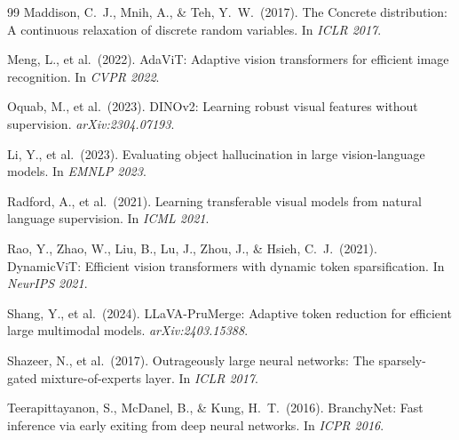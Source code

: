 \documentclass[11pt,a4paper]{article}
\begin{document}
\begin{thebibliography}{99}
Maddison, C.~J., Mnih, A., \& Teh, Y.~W.\ (2017).
\newblock The Concrete distribution: A continuous relaxation of discrete random
  variables.
\newblock In \textit{ICLR 2017}.

Meng, L., et al.\ (2022).
\newblock AdaViT: Adaptive vision transformers for efficient image recognition.
\newblock In \textit{CVPR 2022}.

Oquab, M., et al.\ (2023).
\newblock DINOv2: Learning robust visual features without supervision.
\newblock \textit{arXiv:2304.07193}.

Li, Y., et al.\ (2023).
\newblock Evaluating object hallucination in large vision-language models.
\newblock In \textit{EMNLP 2023}.

Radford, A., et al.\ (2021).
\newblock Learning transferable visual models from natural language supervision.
\newblock In \textit{ICML 2021}.

Rao, Y., Zhao, W., Liu, B., Lu, J., Zhou, J., \& Hsieh, C.~J.\ (2021).
\newblock DynamicViT: Efficient vision transformers with dynamic token
  sparsification.
\newblock In \textit{NeurIPS 2021}.

Shang, Y., et al.\ (2024).
\newblock LLaVA-PruMerge: Adaptive token reduction for efficient large
  multimodal models.
\newblock \textit{arXiv:2403.15388}.

Shazeer, N., et al.\ (2017).
\newblock Outrageously large neural networks: The sparsely-gated
  mixture-of-experts layer.
\newblock In \textit{ICLR 2017}.

Teerapittayanon, S., McDanel, B., \& Kung, H.~T.\ (2016).
\newblock BranchyNet: Fast inference via early exiting from deep neural
  networks.
\newblock In \textit{ICPR 2016}.

\end{thebibliography}
\end{document}
